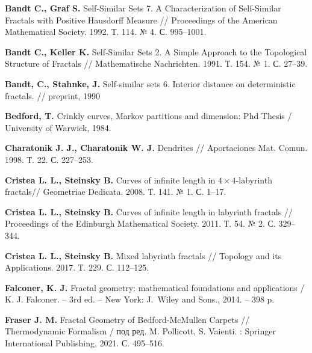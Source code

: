 %
%




\begin{thebibliography}{99}

{\bf Bandt C., Graf S. }
Self-Similar Sets 7. A Characterization of Self-Similar Fractals with Positive Hausdorff Measure // Proceedings of the American Mathematical Society. 1992. Т. 114. № 4. С. 995–1001.

{\bf Bandt C., Keller K.}
Self‐Similar Sets 2. A Simple Approach to the Topological Structure of Fractals // 
Mathematische Nachrichten. 1991. Т. 154. № 1. С. 27--39.

{\bf Bandt, C., Stahnke, J.}
Self-similar sets 6. Interior distance on deterministic fractals. //
preprint, 1990

{\bf Bedford, T. }
Crinkly curves, Markov partitions and dimension: Phd Thesis / University of Warwick, 1984.

{\bf Charatonik J. J., Charatonik W. J.}
Dendrites // 
Aportaciones Mat. Comun. 1998. Т. 22. С. 227--253.

{\bf Cristea L. L., Steinsky B. }
Curves of infinite length in $4\times4$-labyrinth fractals// 
Geometriae Dedicata. 2008. Т. 141. № 1. С. 1--17.


{\bf Cristea L. L., Steinsky B. }
Curves of infinite length in labyrinth fractals // 
Proceedings of the Edinburgh Mathematical Society. 2011. Т. 54. № 2. С. 329--344.


{\bf Cristea L. L., Steinsky B. }
Mixed labyrinth fractals // 
Topology and its Applications. 2017. Т. 229. С. 112--125.

{\bf Falconer, K. J.} 
Fractal geometry: mathematical foundations and applications / 
K. J. Falconer. -- 3rd ed. -- New York: J.~Wiley and Sons., 2014. -- 398 p.

{\bf Fraser J. M. }
Fractal Geometry of Bedford-McMullen Carpets // 
Thermodynamic Formalism / под ред. M. Pollicott, S. Vaienti. : Springer International Publishing, 2021. С. 495--516.


\end{thebibliography}
